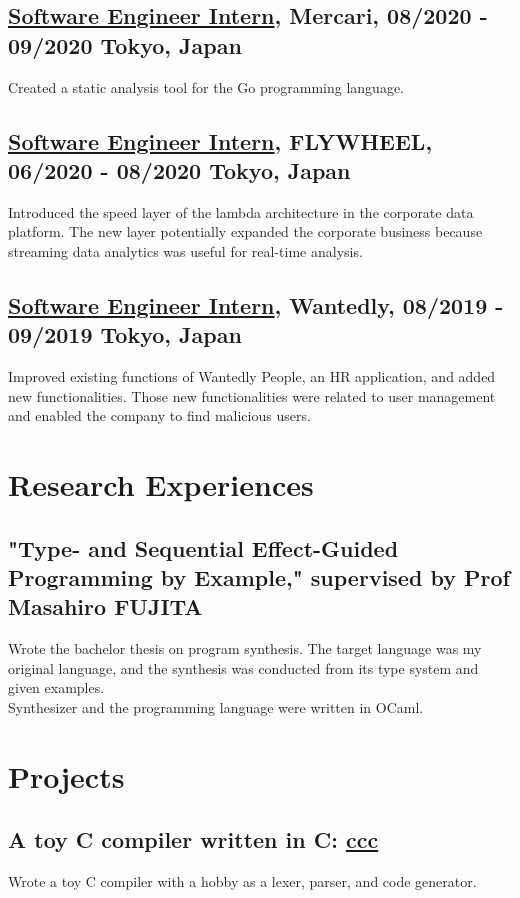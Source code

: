 \documentclass[10pt]{article}
\begin{document}
  \subsection*{\underline{Software Engineer Intern}, Mercari, 08/2020 - 09/2020 \hfill Tokyo, Japan}
    Created a static analysis tool for the Go programming language.
  \subsection*{\underline{Software Engineer Intern}, FLYWHEEL, 06/2020 - 08/2020 \hfill Tokyo, Japan}
    Introduced the speed layer of the lambda architecture in the corporate data platform.
    The new layer potentially expanded the corporate business because streaming data analytics was useful for real-time analysis.
  \subsection*{\underline{Software Engineer Intern}, Wantedly, 08/2019 - 09/2019 \hfill Tokyo, Japan}
    Improved existing functions of Wantedly People, an HR application, and added new functionalities.
    Those new functionalities were related to user management and enabled the company to find malicious users.

\section*{Research Experiences}
  \subsection*{"Type- and Sequential Effect-Guided Programming by Example," supervised by Prof Masahiro FUJITA}
    Wrote the bachelor thesis on program synthesis.
    The target language was my original language, and the synthesis was conducted from its type system and given examples.
    \\
    Synthesizer and the programming language were written in OCaml.

\section*{Projects}
  \subsection*{A toy C compiler written in C: \href{https://github.com/diohabara/ccc}{ccc}}
    Wrote a toy C compiler with a hobby as a lexer, parser, and code generator.
\end{document}
